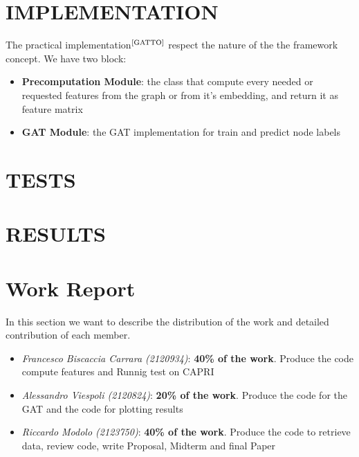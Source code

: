 \documentclass[12pt,conference]{ieeeconf} %
\begin{document}
\section{IMPLEMENTATION} 
The practical implementation$^{\text{\cite{GATTO}}}$ respect the nature of the the framework concept.
We have two block:
\begin{itemize}
    \item{\textbf{Precomputation Module}: the class that compute every needed or requested features from the graph or from it's embedding, and return it as feature matrix}
    \item{\textbf{GAT Module}: the GAT implementation for train and predict node labels}
\end{itemize}


\section{TESTS} 

\section{RESULTS} 

\vspace{\fill}
\printbibliography
\newpage
\section*{Work Report}
In this section we want to describe the distribution of the work and detailed contribution of each member.
\begin{itemize}
    \item \textit{Francesco Biscaccia Carrara (2120934)}: {\textbf{40\% of the work}. Produce the code compute features and Runnig test on CAPRI}\\
    \item \textit{Alessandro Viespoli (2120824)}: {\textbf{20\% of the work}. Produce the code for the GAT and the code for plotting results}\\
    \item \textit{Riccardo Modolo (2123750)}: {\textbf{40\% of the work}. Produce the code to retrieve data, review code, write Proposal, Midterm  and final Paper}
\end{itemize}
\end{document}
